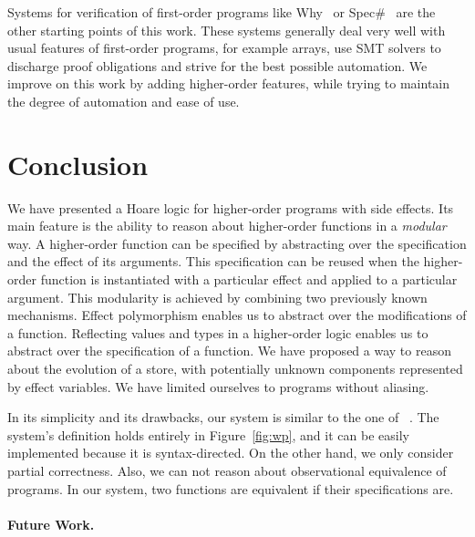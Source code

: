 \documentclass[a4paper]{llncs}
\begin{document}
Systems for verification of first-order programs like
Why~\cite{Filliatre00a,filliatre07cav} or Spec\#~\cite{BarnettLS04} are the
other starting points of this work. These systems generally deal very well
with usual features of first-order programs, for example arrays, use SMT
solvers to discharge proof obligations and strive for the best possible
automation. We improve on this work by adding higher-order features,
while trying to maintain the degree of automation and ease of use.

\section{Conclusion}
\label{sec:conclusion}

We have presented a Hoare logic for higher-order programs with side
effects. Its main feature is the ability to reason about higher-order
functions in a {\em modular} way. A higher-order function can be
specified by abstracting over the specification and the effect of its
arguments. This specification can be reused when the higher-order
function is instantiated with a particular effect and applied to a
particular argument. This modularity is achieved by combining two
previously known mechanisms. Effect polymorphism enables us to
abstract over the modifications of a function. Reflecting values and
types in a higher-order logic enables us to abstract over the
specification of a function. We have proposed a way to
reason about the evolution of a store, with potentially unknown
components represented by effect variables. We have limited ourselves to
programs without aliasing.

In its simplicity and its drawbacks, our system is similar to the one
of ~\cite{regis-gianas-pottier-08}. The system's definition holds
entirely in Figure~\ref{fig:wp}, and it can be easily
implemented because it is syntax-directed. On the other hand, we only
consider partial correctness. Also, we can not reason about
observational equivalence of programs. In our system, two functions
are equivalent if their specifications are.


\paragraph{Future Work.}
\end{document}
